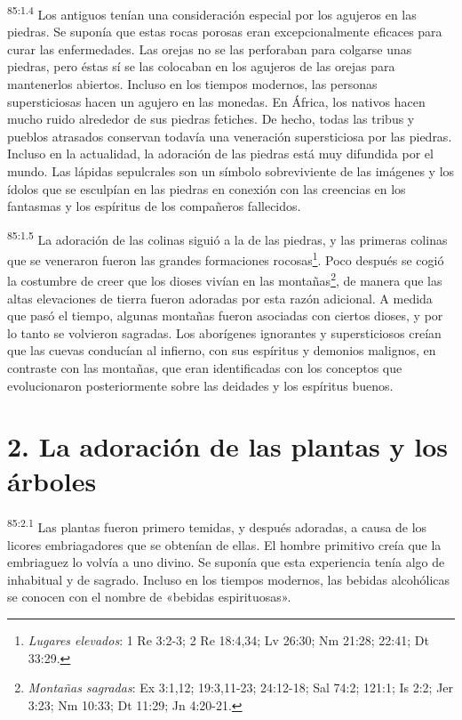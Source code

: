 \par
\textsuperscript{85:1.4} Los antiguos tenían una consideración especial por los agujeros en las piedras. Se suponía que estas rocas porosas eran excepcionalmente eficaces para curar las enfermedades. Las orejas no se las perforaban para colgarse unas piedras, pero éstas sí se las colocaban en los agujeros de las orejas para mantenerlos abiertos. Incluso en los tiempos modernos, las personas supersticiosas hacen un agujero en las monedas. En África, los nativos hacen mucho ruido alrededor de sus piedras fetiches. De hecho, todas las tribus y pueblos atrasados conservan todavía una veneración supersticiosa por las piedras. Incluso en la actualidad, la adoración de las piedras está muy difundida por el mundo. Las lápidas sepulcrales son un símbolo sobreviviente de las imágenes y los ídolos que se esculpían en las piedras en conexión con las creencias en los fantasmas y los espíritus de los compañeros fallecidos.

\par
\textsuperscript{85:1.5} La adoración de las colinas siguió a la de las piedras, y las primeras colinas que se veneraron fueron las grandes formaciones rocosas\footnote{\textit{Lugares elevados}: 1 Re 3:2-3; 2 Re 18:4,34; Lv 26:30; Nm 21:28; 22:41; Dt 33:29.}. Poco después se cogió la costumbre de creer que los dioses vivían en las montañas\footnote{\textit{Montañas sagradas}: Ex 3:1,12; 19:3,11-23; 24:12-18; Sal 74:2; 121:1; Is 2:2; Jer 3:23; Nm 10:33; Dt 11:29; Jn 4:20-21.}, de manera que las altas elevaciones de tierra fueron adoradas por esta razón adicional. A medida que pasó el tiempo, algunas montañas fueron asociadas con ciertos dioses, y por lo tanto se volvieron sagradas. Los aborígenes ignorantes y supersticiosos creían que las cuevas conducían al infierno, con sus espíritus y demonios malignos, en contraste con las montañas, que eran identificadas con los conceptos que evolucionaron posteriormente sobre las deidades y los espíritus buenos.

\section*{2. La adoración de las plantas y los árboles}
\par
\textsuperscript{85:2.1} Las plantas fueron primero temidas, y después adoradas, a causa de los licores embriagadores que se obtenían de ellas. El hombre primitivo creía que la embriaguez lo volvía a uno divino. Se suponía que esta experiencia tenía algo de inhabitual y de sagrado. Incluso en los tiempos modernos, las bebidas alcohólicas se conocen con el nombre de «bebidas espirituosas».

